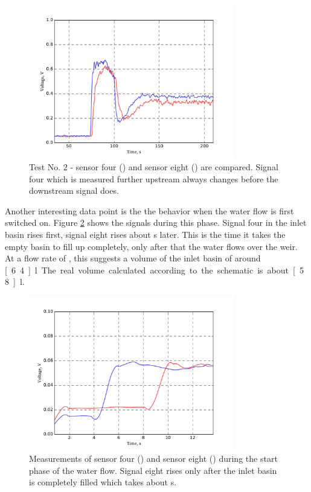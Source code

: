 \begin{figure}[H]
	\begin{center}
		\includegraphics[width=0.8\textwidth]{images/log080716_2.pdf} 
		\caption{Test No. 2 - sensor four (\drawline[blue]) and sensor eight (\drawline[red]) are compared. Signal four which is measured further upstream always changes before the downstream signal does.}
		\label{fig:test2}
	\end{center}
\end{figure}

Another interesting data point is the the behavior when the water flow is first switched on. Figure \ref{fig:test2_on} shows the signals during this phase. Signal four in the inlet basin rises first, signal eight rises about \unit[4]{s} later. This is the time it takes the empty basin to fill up completely, only after that the water flows over the weir. At a flow rate of , this suggests a volume of the inlet basin of around \unit[6.4]{l}. The real volume calculated according to the schematic is about \unit[5.8]{l}.

\begin{figure}[H]
	\begin{center}
		\includegraphics[width=0.8\textwidth]{images/log080716_2_on.pdf} 
		\caption{Measurements of sensor four (\drawline[blue]) and sensor eight (\drawline[red]) during the start phase of the water flow. Signal eight rises only after the inlet basin is completely filled which takes about \unit[4]{s}.}
		\label{fig:test2_on}
	\end{center}
\end{figure}

